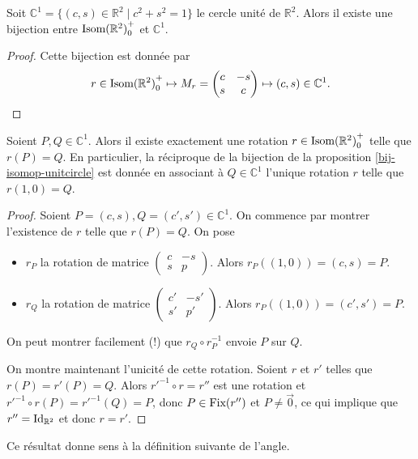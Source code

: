 \documentclass{book}
\numberwithin{equation}{section}
\providecommand{\plan}{{\mathbb R^2}}
\providecommand{\origin}{{\vec 0}}
\providecommand{\id}{{\textnormal{Id}}}
\providecommand{\IdR}{{\id_\plan}}
\providecommand{\isom}{{\textnormal{Isom}(\plan)}}
\providecommand{\isomop}{\isom_0^+}
\providecommand{\unitcircle}{{\mathbb C^1}}
\providecommand{\Fix}{{\textnormal{Fix}}}
\providecommand{\st}{\mid}
\begin{document}
\begin{prop}\label{bij-isomop-unitcircle}
	Soit $\unitcircle = \{(c, s) \in \plan \st c^2 + s^2 = 1\}$ le cercle unité de $\plan$. Alors il existe une bijection entre $\isomop$ et $\unitcircle$.
\end{prop}
\begin{proof}
	Cette bijection est donnée par
	\begin{align*}
		r \in \isomop \mapsto M_r = \begin{pmatrix}
		c & -s\\
		s & c
		\end{pmatrix}
		\mapsto (c, s) \in \unitcircle.
	\end{align*}
\end{proof}

\begin{thm}
	Soient $P, Q \in \unitcircle$. Alors il existe exactement une rotation $r \in \isomop$ telle que $r(P) = Q$. En particulier, la réciproque de la bijection de la proposition \ref{bij-isomop-unitcircle} est donnée en associant à $Q \in \unitcircle$ l'unique rotation $r$ telle que $r(1, 0) = Q$.
\end{thm}
\begin{proof}
	Soient $P = (c, s), Q = (c', s') \in \unitcircle$. On commence par montrer l'existence de $r$ telle que $r(P) = Q$. On pose
	\begin{itemize}
		\item $r_P$ la rotation de matrice $\begin{pmatrix}
			c & -s\\
			s & p
		\end{pmatrix}$. Alors $r_P((1, 0)) = (c, s) = P$.
		\item $r_Q$ la rotation de matrice $\begin{pmatrix}
			c' & -s'\\
			s' & p'
		\end{pmatrix}$. Alors $r_P((1, 0)) = (c', s') = P$.
	\end{itemize}
	On peut montrer facilement (!) que $r_Q \circ r_P^{-1}$ envoie $P$ sur $Q$.\par
	On montre maintenant l'unicité de cette rotation. Soient $r$ et $r'$ telles que $r(P) = r'(P) = Q$. Alors $r'^{-1} \circ r = r''$ est une rotation et $r'^{-1} \circ r(P) = r'^{-1}(Q) = P$, donc $P \in \Fix(r'')$ et $P \neq \origin$, ce qui implique que $r'' = \IdR$ et donc $r = r'$.
\end{proof}

Ce résultat donne sens à la définition suivante de l'angle.
\end{document}
